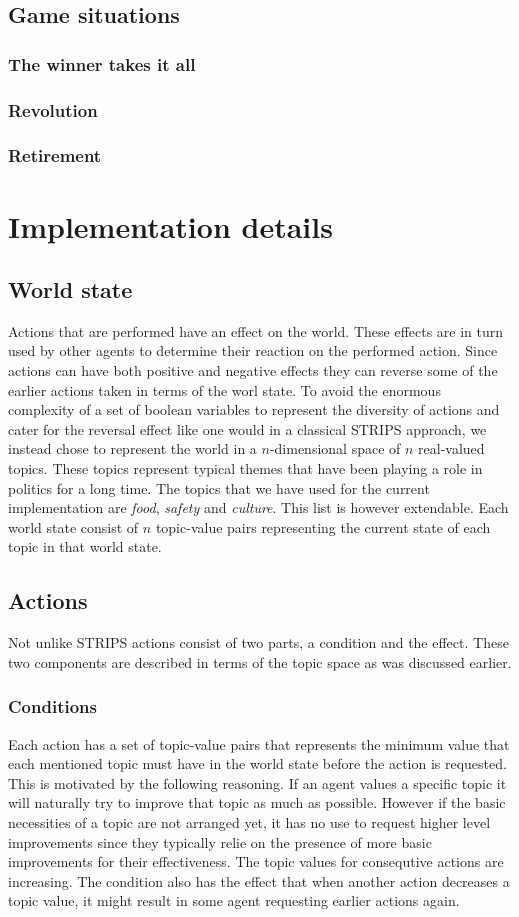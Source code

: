 \documentclass[11pt,a4paper]{article}
\begin{document}
\subsection{Game situations}
  \subsubsection{The winner takes it all}
  \subsubsection{Revolution}
  \subsubsection{Retirement}
\section{Implementation details}
  \subsection{World state}
    Actions that are performed have an effect on the world. These effects are in turn used by other agents to determine their reaction on the performed action. Since actions can have both positive and negative effects they can reverse some of the earlier actions taken in terms of the worl state. To avoid the enormous complexity of a set of boolean variables to represent the diversity of actions and cater for the reversal effect like one would in a classical STRIPS approach, we instead chose to represent the world in a $n$-dimensional space of $n$ real-valued topics. These topics represent typical themes that have been playing a role in politics for a long time. The topics that we have used for the current implementation are \emph{food}, \emph{safety} and \emph{culture}. This list is however extendable. Each world state consist of $n$ topic-value pairs representing the current state of each topic in that world state.
  \subsection{Actions}
    Not unlike STRIPS actions consist of two parts, a condition and the effect. These two components are described in terms of the topic space as was discussed earlier.
    \subsubsection{Conditions}
      Each action has a set of topic-value pairs that represents the minimum value that each mentioned topic must have in the world state before the action is requested. This is motivated by the following reasoning. If an agent values a specific topic it will naturally try to improve that topic as much as possible. However if the basic necessities of a topic are not arranged yet, it has no use to request higher level improvements since they typically relie on the presence of more basic improvements for their effectiveness. The topic values for consequtive actions are increasing. The condition also has the effect that when another action decreases a topic value, it might result in some agent requesting earlier actions again.
\end{document}
